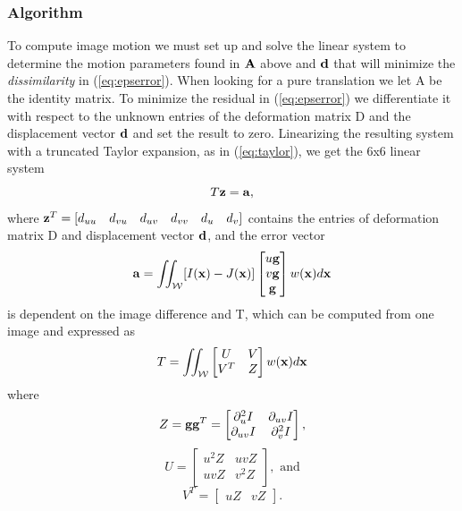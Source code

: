 \documentclass{article}
\begin{document}
\subsubsection{Algorithm}
To compute image motion we must set up and solve the linear system to determine the motion parameters found in ${\bf A}$ above and ${\bf d}$ that will minimize the {\em dissimilarity} in (\ref{eq:epserror}).  When looking for a pure translation we let A be the identity matrix.  To minimize the residual in (\ref{eq:epserror}) we differentiate it with respect to the unknown entries of the deformation matrix D and the displacement vector ${\bf d}$ and set the result to zero.  Linearizing the resulting system with a truncated Taylor expansion, as in (\ref{eq:taylor}), we get the 6x6 linear system
\begin{equation*}
  T{\bf z = a}, 
\end{equation*}
where ${\bf z}^T = [d_{uu}\quad d_{vu}\quad d_{uv}\quad d_{vv}\quad d_u\quad d_v]$ contains the entries of deformation matrix D and displacement vector ${\bf d}$, and the error vector
\begin{equation}
  {\bf a} = \iint_{\mathcal{W}}[I({\bf x})- J({\bf x})]\begin{bmatrix}
    u {\bf g}\\
    v {\bf g}\\
    {\bf g}
  \end{bmatrix}
  w({\bf x})d{\bf x}
  \label{eq:erra}
\end{equation}
is dependent on the image difference and T, which can be computed from one image and expressed as
\begin{equation}
  T = \iint_{\mathcal{W}}\begin{bmatrix}
    U & V\\
    V^T & Z\\
  \end{bmatrix}
  w({\bf x})d{\bf x}
  \label{eq:paramT}
\end{equation}
where
\[
Z = {\bf g g}^T = 
\begin{bmatrix}
  \partial_{u}^2 I & \partial_{uv} I \\
  \partial_{uv} I & \partial_{v}^2 I
\end{bmatrix},
\]
\[
U =
\begin{bmatrix}
  u^2 Z &uv Z \\
  uv Z  &v^2 Z \\
\end{bmatrix}, \text{ and}
\]
\[
V^T =
\begin{bmatrix}
  u Z &v Z 
\end{bmatrix}.
\]
\end{document}
